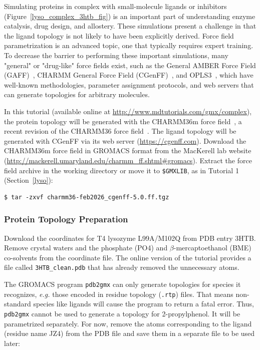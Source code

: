 \documentclass[9pt,tutorial,pubversion]{livecoms}
\newcommand{\urlstring}{http://www.mdtutorials.com/gmx}
\newcommand{\tutorialcomplex}{\url{\urlstring/complex}}
\begin{document}
Simulating proteins in complex with small-molecule ligands or inhibitors (Figure~\ref{lyso_complex_3htb_fig}) is an important part of understanding enzyme catalysis, drug design, and allostery. These simulations present a challenge in that the ligand topology is not likely to have been explicitly derived. Force field parametrization is an advanced topic, one that typically requires expert training. To decrease the barrier to performing these important simulations, many "general" or "drug-like" force fields exist, such as the General AMBER Force Field (GAFF)~\cite{Wang2004}, CHARMM General Force Field (CGenFF)~\cite{Vanommeslaeghe2010}, and OPLS3~\cite{Harder2016}, which have well-known methodologies, parameter assignment protocols, and web servers that can generate topologies for arbitrary molecules.

In this tutorial (available online at \tutorialcomplex), the protein topology will be generated with the CHARMM36m force field~\cite{Huang2016}, a recent revision of the CHARMM36 force field~\cite{Best2012}. The ligand topology will be generated with CGenFF via its web server (\url{https://cgenff.com}). Download the CHARMM36m force field in GROMACS format from the MacKerell lab website (\url{http://mackerell.umaryland.edu/charmm_ff.shtml#gromacs}). Extract the force field archive in the working directory or move it to \texttt{\$GMXLIB}, as in Tutorial 1 (Section~\ref{lyso}):

\begin{lstlisting}
$ tar -zxvf charmm36-feb2026_cgenff-5.0.ff.tgz
\end{lstlisting}

\subsubsection{Protein Topology Preparation} \label{complex_top}

Download the coordinates for T4 lysozyme L99A/M102Q from PDB entry 3HTB. Remove crystal waters and the phosphate (PO4) and $\beta$-mercaptoethanol (BME) co-solvents from the coordinate file. The online version of the tutorial provides a file called \texttt{3HTB\_clean.pdb} that has already removed the unnecessary atoms.

The GROMACS program \texttt{pdb2gmx} can only generate topologies for species it recognizes, {\em e.g.} those encoded in residue topology (\texttt{.rtp}) files. That means non-standard species like ligands will cause the program to return a fatal error. Thus, \texttt{pdb2gmx} cannot be used to generate a topology for 2-propylphenol. It will be parametrized separately. For now, remove the atoms corresponding to the ligand (residue name JZ4) from the PDB file and save them in a separate file to be used later:
\end{document}
